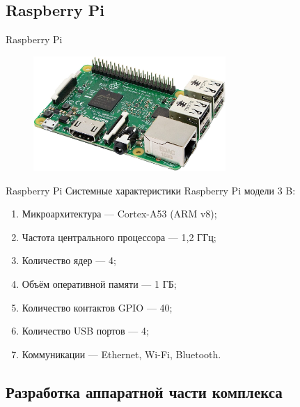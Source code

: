 \subsection{Raspberry Pi}

\begin{frame}{Raspberry Pi}
  \begin{figure}[H]
    \centering
    \includegraphics[width=0.65\textwidth]{assets/images/rpi__image.jpg}
    \label{img:rpi__image}
  \end{figure}
\end{frame}

\begin{frame}{Raspberry Pi}
  Системные характеристики Raspberry Pi модели 3 B:

  \begin{enumerate}
    \item Микроархитектура --- Cortex-A53 (ARM v8);
    \item Частота центрального процессора --- 1,2 ГГц;
    \item Количество ядер --- 4;
    \item Объём оперативной памяти --- 1 ГБ;
    \item Количество контактов GPIO --- 40;
    \item Количество USB портов --- 4;
    \item Коммуникации --- Ethernet, Wi-Fi, Bluetooth.
  \end{enumerate}
\end{frame}

\subsection{Разработка аппаратной части комплекса}

